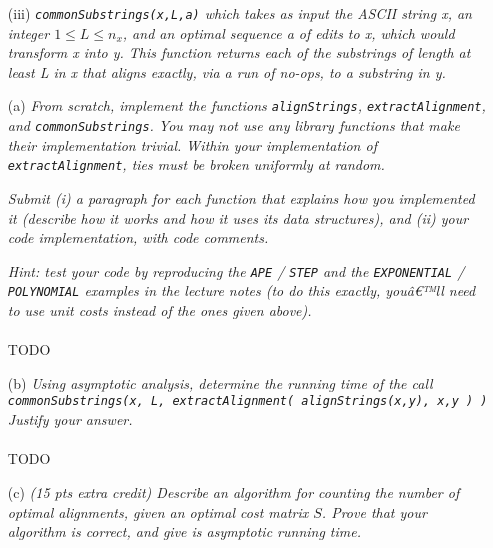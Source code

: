 \documentclass[11pt]{article} \setlength{\oddsidemargin}{0in}
\begin{document}
{\begin{enumerate}
\begin{verbatim}
extractAlignment(S,x,y) : // S is an optimal cost matrix from alignStrings
  initialize a            // empty vector of edit operations
  [i,j] = [nx,ny]         // initialize the search for a path to S[0,0]
  while i > 0 or j > 0
    a[i] = determineOptimalOp(S,i,j,x,y) // what was an optimal choice?
    [i,j] = updateIndices(S,i,j,a) // move to next position
  }
  return a
\end{verbatim}

    \textit{When storing the sequence of edit operations in
      \texttt{a}, use a special symbol to denote no-ops.}

  \item[(iii)] \textit{\texttt{commonSubstrings(x,L,a)} which takes as
      input the ASCII string x, an integer $1 \le L \le n_x$, and an
      optimal sequence a of edits to x, which would transform x into
      y. This function returns each of the substrings of length at
      least L in x that aligns exactly, via a run of no-ops, to a
      substring in y.}
  \end{enumerate}

  \begin{enumerate}
  \item[(a)] \textit{From scratch, implement the functions
      \texttt{alignStrings}, \texttt{extractAlignment}, and
      \texttt{commonSubstrings}. You may not use any library functions
      that make their implementation trivial. Within your
      implementation of \texttt{extractAlignment}, ties must be broken
      uniformly at random.}

    \textit{Submit (i) a paragraph for each function that explains how
      you implemented it (describe how it works and how it uses its
      data structures), and (ii) your code implementation, with code
      comments.}

    \textit{Hint: test your code by reproducing the \texttt{APE} /
      \texttt{STEP} and the \texttt{EXPONENTIAL} / \texttt{POLYNOMIAL}
      examples in the lecture notes (to do this exactly, youâ€™ll need
      to use unit costs instead of the ones given above).}
    \\\\
    TODO
    \\
  \item[(b)] \textit{Using asymptotic analysis, determine the running
      time of the call \texttt{commonSubstrings(x, L,
        extractAlignment( alignStrings(x,y), x,y ) )} Justify your
      answer.}
    \\\\
    TODO
    \\
  \item[(c)] \textit{(15 pts extra credit) Describe an algorithm for
      counting the number of optimal alignments, given an optimal cost
      matrix $S$. Prove that your algorithm is correct, and give is
      asymptotic running time.}


\end{enumerate}}
\end{document}
